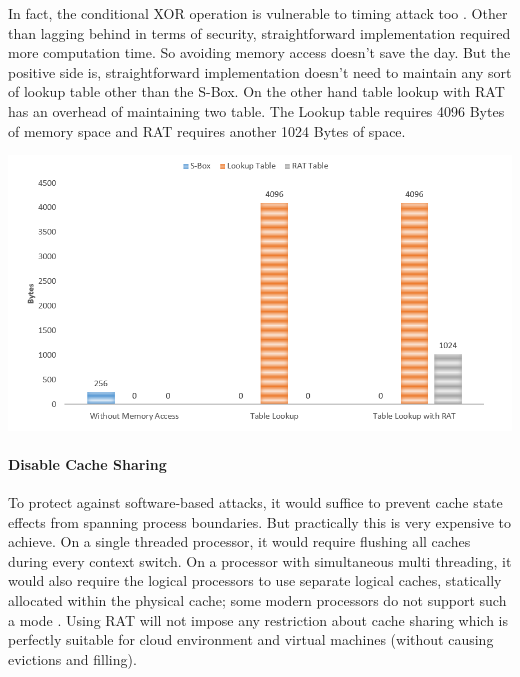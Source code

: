 \documentclass[3p]{elsarticle}
\begin{document}
In fact, the conditional XOR operation is vulnerable to timing attack too \citep{stallings5}. Other than lagging behind in terms of security, straightforward implementation required more computation time. So avoiding memory access doesn't save the day. But the positive side is, straightforward implementation doesn't need to maintain any sort of lookup table other than the S-Box. On the other hand table lookup with RAT has an overhead of maintaining two table. The Lookup table requires 4096 Bytes of memory space and RAT requires another 1024 Bytes of space.

\begin{center}
\includegraphics[scale=0.4,natwidth=902,natheight=493]{Figures/performance_memory(new).png}
\label{fig: Performance Evaluation of RAT in terms of Memory Usage.}
\end{center}

\paragraph{Disable Cache Sharing}
To protect against software-based attacks, it would suffice to prevent cache state effects from spanning process boundaries. But practically this is very expensive to achieve. On a single threaded processor, it would require flushing all caches during every context switch. On a processor with simultaneous multi threading, it would also require the logical processors to use separate logical caches, statically allocated within the physical cache; some modern processors do not support such a mode \citep{osvik}. Using RAT will not impose any restriction about cache sharing which is perfectly suitable for cloud environment and virtual machines (without causing evictions and filling).
\end{document}
